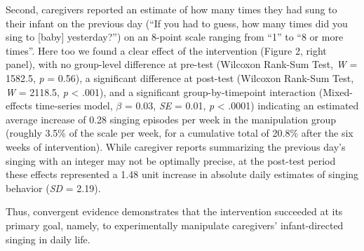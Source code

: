 \documentclass[
]{article}
\begin{document}
Second, caregivers reported an estimate of how many times they had sung
to their infant on the previous day (``If you had to guess, how many
times did you sing to {[}baby{]} yesterday?'') on an 8-point scale
ranging from ``1'' to ``8 or more times''. Here too we found a clear
effect of the intervention (Figure 2, right panel), with no group-level
difference at pre-test (Wilcoxon Rank-Sum Test, \emph{W} = 1582.5,
\emph{p} = 0.56), a significant difference at post-test (Wilcoxon
Rank-Sum Test, \emph{W} = 2118.5, \emph{p} \textless{} .001), and a
significant group-by-timepoint interaction (Mixed-effects time-series
model, \(\beta\) = 0.03, \emph{SE} = 0.01, \emph{p} \textless{} .0001)
indicating an estimated average increase of 0.28 singing episodes per
week in the manipulation group (roughly 3.5\% of the scale per week, for
a cumulative total of 20.8\% after the six weeks of intervention). While
caregiver reports summarizing the previous day's singing with an integer
may not be optimally precise, at the post-test period these effects
represented a 1.48 unit increase in absolute daily estimates of singing
behavior (\emph{SD} = 2.19).

Thus, convergent evidence demonstrates that the intervention succeeded
at its primary goal, namely, to experimentally manipulate caregivers'
infant-directed singing in daily life.
\end{document}
